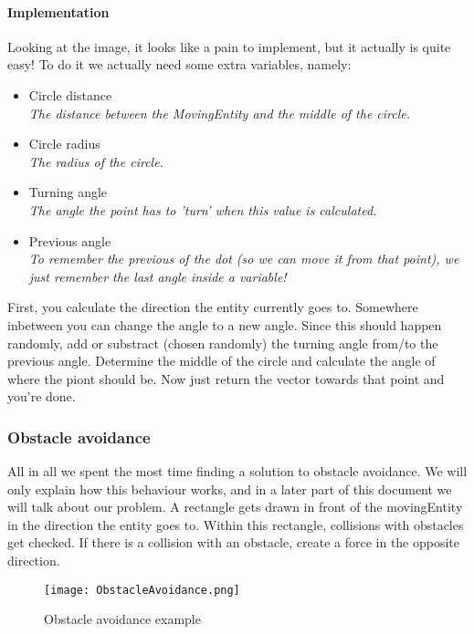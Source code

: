 \paragraph{Implementation}
Looking at the image, it looks like a pain to implement, but it actually is quite easy!
To do it we actually need some extra variables, namely:
\begin{itemize}
    \item Circle distance
    \\\textit{The distance between the MovingEntity and the middle of the circle.}
    \item Circle radius
    \\\textit{The radius of the circle.}
    \item Turning angle
    \\\textit{The angle the point has to 'turn' when this value is calculated.}
    \item Previous angle
    \\\textit{To remember the previous of the dot (so we can move it from that point), we just remember the last angle inside a variable!}
\end{itemize}
First, you calculate the direction the entity currently goes to.
Somewhere inbetween you can change the angle to a new angle.
Since this should happen randomly, add or substract (chosen randomly) the turning angle from/to the previous angle.
Determine the middle of the circle and calculate the angle of where the piont should be.
Now just return the vector towards that point and you're done.
\subsubsection{Obstacle avoidance}\label{sec:ObstacleAvoidance}
All in all we spent the most time finding a solution to obstacle avoidance.
We will only explain how this behaviour works, and in a later part of this document we will talk about our problem.
A rectangle gets drawn in front of the movingEntity in the direction the entity goes to.
Within this rectangle, collisions with obstacles get checked.
If there is a collision with an obstacle, create a force in the opposite direction.
\begin{figure}[h!]
    \begin{center}
        \texttt{[image: ObstacleAvoidance.png]}
    \end{center}
    \caption{Obstacle avoidance example}
    \label{fig:ObstacleAvoidanceExplanation}
\end{figure}
